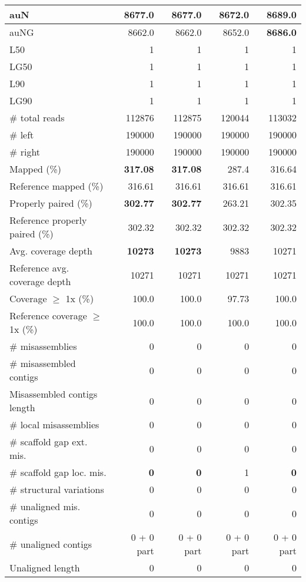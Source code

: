 \documentclass[12pt,a4paper]{article}
\begin{document}
\begin{table}[ht]
\begin{center}
\begin{tabular}{|l*{4}{|r}|}
auN & 8677.0 & 8677.0 & 8672.0 & {\bf 8689.0} \\ \hline
auNG & 8662.0 & 8662.0 & 8652.0 & {\bf 8686.0} \\ \hline
L50 & 1 & 1 & 1 & 1 \\ \hline
LG50 & 1 & 1 & 1 & 1 \\ \hline
L90 & 1 & 1 & 1 & 1 \\ \hline
LG90 & 1 & 1 & 1 & 1 \\ \hline
\# total reads & 112876 & 112875 & 120044 & 113032 \\ \hline
\# left & 190000 & 190000 & 190000 & 190000 \\ \hline
\# right & 190000 & 190000 & 190000 & 190000 \\ \hline
Mapped (\%) & {\bf 317.08} & {\bf 317.08} & 287.4 & 316.64 \\ \hline
Reference mapped (\%) & 316.61 & 316.61 & 316.61 & 316.61 \\ \hline
Properly paired (\%) & {\bf 302.77} & {\bf 302.77} & 263.21 & 302.35 \\ \hline
Reference properly paired (\%) & 302.32 & 302.32 & 302.32 & 302.32 \\ \hline
Avg. coverage depth & {\bf 10273} & {\bf 10273} & 9883 & 10271 \\ \hline
Reference avg. coverage depth & 10271 & 10271 & 10271 & 10271 \\ \hline
Coverage $\geq$ 1x (\%) & 100.0 & 100.0 & 97.73 & 100.0 \\ \hline
Reference coverage $\geq$ 1x (\%) & 100.0 & 100.0 & 100.0 & 100.0 \\ \hline
\# misassemblies & 0 & 0 & 0 & 0 \\ \hline
\# misassembled contigs & 0 & 0 & 0 & 0 \\ \hline
Misassembled contigs length & 0 & 0 & 0 & 0 \\ \hline
\# local misassemblies & 0 & 0 & 0 & 0 \\ \hline
\# scaffold gap ext. mis. & 0 & 0 & 0 & 0 \\ \hline
\# scaffold gap loc. mis. & {\bf 0} & {\bf 0} & 1 & {\bf 0} \\ \hline
\# structural variations & 0 & 0 & 0 & 0 \\ \hline
\# unaligned mis. contigs & 0 & 0 & 0 & 0 \\ \hline
\# unaligned contigs & 0 + 0 part & 0 + 0 part & 0 + 0 part & 0 + 0 part \\ \hline
Unaligned length & 0 & 0 & 0 & 0 \\ \hline

\end{tabular}
\end{center}
\end{table}
\end{document}
